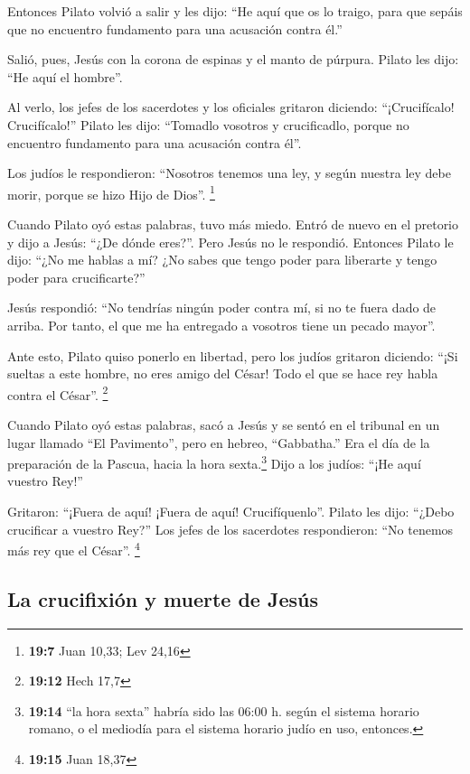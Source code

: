  Entonces Pilato volvió a salir y les dijo: ``He aquí que
os lo traigo, para que sepáis que no encuentro fundamento para una
acusación contra él.''

 Salió, pues, Jesús con la corona de espinas y el manto de
púrpura. Pilato les dijo: ``He aquí el hombre''.

 Al verlo, los jefes de los sacerdotes y los oficiales
gritaron diciendo: ``¡Crucifícalo! Crucifícalo!'' Pilato les dijo:
``Tomadlo vosotros y crucificadlo, porque no encuentro fundamento para
una acusación contra él''.

 Los judíos le respondieron: ``Nosotros tenemos una ley, y
según nuestra ley debe morir, porque se hizo Hijo de Dios''. \footnote{\textbf{19:7}
  Juan 10,33; Lev 24,16}

 Cuando Pilato oyó estas palabras, tuvo más miedo.
 Entró de nuevo en el pretorio y dijo a Jesús: ``¿De dónde
eres?''. Pero Jesús no le respondió.  Entonces Pilato le
dijo: ``¿No me hablas a mí? ¿No sabes que tengo poder para liberarte y
tengo poder para crucificarte?''

 Jesús respondió: ``No tendrías ningún poder contra mí,
si no te fuera dado de arriba. Por tanto, el que me ha entregado a
vosotros tiene un pecado mayor''.

 Ante esto, Pilato quiso ponerlo en libertad, pero los
judíos gritaron diciendo: ``¡Si sueltas a este hombre, no eres amigo del
César! Todo el que se hace rey habla contra el César''. \footnote{\textbf{19:12}
  Hech 17,7}

 Cuando Pilato oyó estas palabras, sacó a Jesús y se
sentó en el tribunal en un lugar llamado ``El Pavimento'', pero en
hebreo, ``Gabbatha.''  Era el día de la preparación de la
Pascua, hacia la hora sexta.\footnote{\textbf{19:14} ``la hora sexta''
  habría sido las 06:00 h. según el sistema horario romano, o el
  mediodía para el sistema horario judío en uso, entonces.} Dijo a los
judíos: ``¡He aquí vuestro Rey!''

 Gritaron: ``¡Fuera de aquí! ¡Fuera de aquí!
Crucifíquenlo''. Pilato les dijo: ``¿Debo crucificar a vuestro Rey?''
Los jefes de los sacerdotes respondieron: ``No tenemos más rey que el
César''. \footnote{\textbf{19:15} Juan 18,37}

\hypertarget{la-crucifixiuxf3n-y-muerte-de-jesuxfas}{%
\subsection{La crucifixión y muerte de
Jesús}\label{la-crucifixiuxf3n-y-muerte-de-jesuxfas}}

